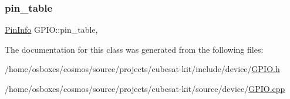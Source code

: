 \subsubsection{\texorpdfstring{pin\+\_\+table}{pin\_table}}
{\footnotesize\ttfamily \hyperlink{structcubesat_1_1PinInfo}{Pin\+Info} G\+P\+I\+O\+::pin\+\_\+table\hspace{0.3cm}{\ttfamily [static]}, {\ttfamily [protected]}}



The documentation for this class was generated from the following files\+:\begin{DoxyCompactItemize}
\item 
/home/osboxes/cosmos/source/projects/cubesat-\/kit/include/device/\hyperlink{GPIO_8h}{G\+P\+I\+O.\+h}\item 
/home/osboxes/cosmos/source/projects/cubesat-\/kit/source/device/\hyperlink{GPIO_8cpp}{G\+P\+I\+O.\+cpp}\end{DoxyCompactItemize}
